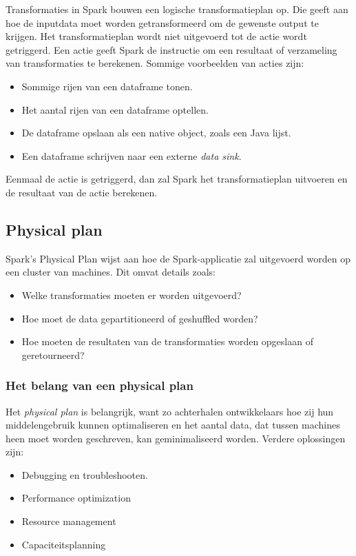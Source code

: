 \documentclass[a4paper,10pt,twoside]{report}
\begin{document}
Transformaties in Spark bouwen een logische transformatieplan op. Die geeft aan hoe de inputdata moet worden getransformeerd om de gewenste output te krijgen. Het transformatieplan wordt niet uitgevoerd tot de actie wordt getriggerd. Een actie geeft Spark de instructie om een resultaat of verzameling van transformaties te berekenen. Sommige voorbeelden van acties zijn:

\begin{itemize}
	\item Sommige rijen van een dataframe tonen.
	\item Het aantal rijen van een dataframe optellen.
	\item De dataframe opslaan als een native object, zoals een Java lijst.
	\item Een dataframe schrijven naar een externe \textit{data sink}.
\end{itemize}

Eenmaal de actie is getriggerd, dan zal Spark het transformatieplan uitvoeren en de resultaat van de actie berekenen. 

\subsection{Physical plan}
Spark's Physical Plan wijst aan hoe de Spark-applicatie zal uitgevoerd worden op een cluster van machines. Dit omvat details zoals:
\begin{itemize}
	\item Welke transformaties moeten er worden uitgevoerd?
	\item Hoe moet de data gepartitioneerd of geshuffled worden?
	\item Hoe moeten de resultaten van de transformaties worden opgeslaan of geretourneerd?
\end{itemize}

\subsubsection{Het belang van een physical plan}

Het \textit{physical plan} is belangrijk, want zo achterhalen ontwikkelaars hoe zij hun middelengebruik kunnen optimaliseren en het aantal data, dat tussen machines heen moet worden geschreven, kan geminimaliseerd worden. Verdere oplossingen zijn:

\begin{itemize}
	\item Debugging en troubleshooten.
	\item Performance optimization
	\item Resource management
	\item Capaciteitsplanning
\end{itemize}
\end{document}
